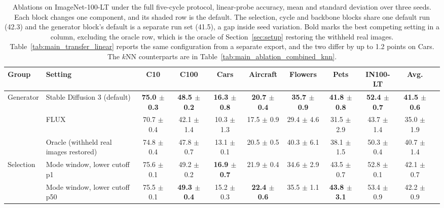 \begin{table}[t]
\centering
\tiny
\setlength{\tabcolsep}{2.6pt}
\renewcommand{\arraystretch}{0.9}
\caption{Ablations on ImageNet-100-LT under the full five-cycle protocol, linear-probe accuracy, mean and standard deviation over three seeds. Each block changes one component, and its shaded row is the default. The selection, cycle and backbone blocks share one default run (42.3) and the generator block's default is a separate run set (41.5), a gap inside seed variation. Bold marks the best competing setting in a column, excluding the oracle row, which is the oracle of Section~\ref{sec:setup} restoring the withheld real images. Table~\ref{tab:main_transfer_linear} reports the same configuration from a separate export, and the two differ by up to 1.2 points on Cars. The $k$NN counterparts are in Table~\ref{tab:main_ablation_combined_knn}.}
\label{tab:main_ablation_combined}
\begin{adjustbox}{max width=\textwidth}
\begin{tabular}{l l c c c c c c c c c}
\toprule
Group & Setting & C10 & C100 & Cars & Aircraft & Flowers & Pets & IN100-LT & Avg. \\
\midrule
\rowcolor{blue!10} Generator & Stable Diffusion 3 (default) & \textbf{75.0 {\scriptsize$\pm$ 0.3}} & \textbf{48.5 {\scriptsize$\pm$ 0.2}} & \textbf{16.3 {\scriptsize$\pm$ 0.8}} & \textbf{20.7 {\scriptsize$\pm$ 0.4}} & \textbf{35.7 {\scriptsize$\pm$ 0.9}} & \textbf{41.8 {\scriptsize$\pm$ 0.8}} & \textbf{52.4 {\scriptsize$\pm$ 0.7}} & \textbf{41.5 {\scriptsize$\pm$ 0.6}} \\
 & FLUX & 70.7 {\scriptsize$\pm$ 0.4} & 42.1 {\scriptsize$\pm$ 1.4} & 10.3 {\scriptsize$\pm$ 1.3} & 17.5 {\scriptsize$\pm$ 0.9} & 29.4 {\scriptsize$\pm$ 4.6} & 31.5 {\scriptsize$\pm$ 2.9} & 43.7 {\scriptsize$\pm$ 1.4} & 35.0 {\scriptsize$\pm$ 1.9} \\
 & Oracle (withheld real images restored) & 74.8 {\scriptsize$\pm$ 0.4} & 47.8 {\scriptsize$\pm$ 0.7} & 13.1 {\scriptsize$\pm$ 0.1} & 20.5 {\scriptsize$\pm$ 0.5} & 40.3 {\scriptsize$\pm$ 6.1} & 38.1 {\scriptsize$\pm$ 1.5} & 50.3 {\scriptsize$\pm$ 0.4} & 40.7 {\scriptsize$\pm$ 1.4} \\
\midrule
Selection & Mode window, lower cutoff p1 & 75.6 {\scriptsize$\pm$ 0.1} & 49.2 {\scriptsize$\pm$ 0.2} & \textbf{16.9 {\scriptsize$\pm$ 0.7}} & 21.9 {\scriptsize$\pm$ 0.4} & 34.6 {\scriptsize$\pm$ 2.9} & 43.5 {\scriptsize$\pm$ 0.7} & 52.8 {\scriptsize$\pm$ 0.1} & 42.1 {\scriptsize$\pm$ 0.7} \\
 & Mode window, lower cutoff p50 & 75.5 {\scriptsize$\pm$ 0.1} & \textbf{49.3 {\scriptsize$\pm$ 0.4}} & 15.2 {\scriptsize$\pm$ 0.3} & \textbf{22.4 {\scriptsize$\pm$ 0.6}} & 35.5 {\scriptsize$\pm$ 1.1} & \textbf{43.8 {\scriptsize$\pm$ 3.1}} & 53.4 {\scriptsize$\pm$ 0.9} & 42.2 {\scriptsize$\pm$ 0.9} \\

\end{tabular}
\end{adjustbox}
\end{table}
